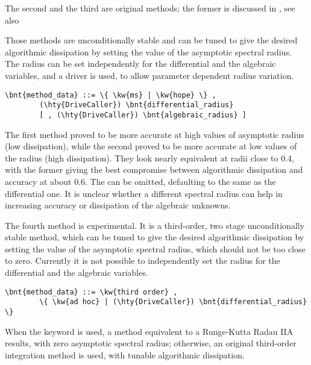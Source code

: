 The second and the third are original 
methods; the former is discussed in \cite{MASARATI-LANZ-MANTEGAZZA-2001},
see also
\begin{quote}
\end{quote} 
Those methods are unconditionally stable and can be tuned to give 
the desired algorithmic dissipation
by setting the value of the asymptotic spectral radius.
The radius can be set independently for the differential
and the algebraic variables, and a driver is used, to allow parameter 
dependent radius variation.
\begin{Verbatim}[commandchars=\\\{\}]
    \bnt{method_data} ::= \{ \kw{ms} | \kw{hope} \} ,
        (\hty{DriveCaller}) \bnt{differential_radius}
        [ , (\hty{DriveCaller}) \bnt{algebraic_radius} ]
\end{Verbatim}
The first method proved to be more accurate at high values of asymptotic
radius (low dissipation), while the second proved to be more accurate
at low values of the radius (high dissipation).
They look nearly equivalent at radii close to 0.4, with the former
giving the best compromise between algorithmic dissipation and accuracy 
at about 0.6.
The  can be omitted, defaulting to the same 
as the differential one.
It is unclear whether a different spectral radius can help in increasing
accuracy or dissipation of the algebraic unknowns.

The fourth method is experimental. It is a third-order,
two stage unconditionally stable method, which can be tuned to give 
the desired algorithmic dissipation by setting the value 
of the asymptotic spectral radius, which should not be 
too close to zero.
Currently it is not possible to independently set the radius 
for the differential and the algebraic variables.
\begin{Verbatim}[commandchars=\\\{\}]
    \bnt{method_data} ::= \kw{third order} ,
        \{ \kw{ad hoc} | (\hty{DriveCaller}) \bnt{differential_radius} \}
\end{Verbatim}
When the keyword  is used, a method equivalent
to a Runge-Kutta Radau IIA results, with zero asymptotic
spectral radius; otherwise, an original third-order
integration method is used, with tunable algorithmic dissipation.


